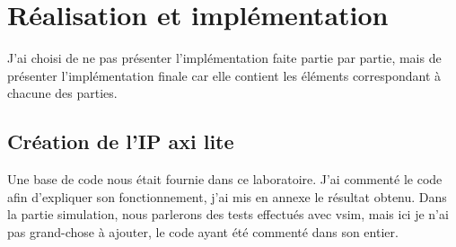 \section{Réalisation et implémentation}

J'ai choisi de ne pas présenter l'implémentation faite partie par partie, mais de présenter l'implémentation finale car elle contient les éléments correspondant à chacune des parties. 

\subsection{Création de l'IP axi lite}

Une base de code nous était fournie dans ce laboratoire. J'ai commenté le code afin d'expliquer son fonctionnement, j'ai mis en annexe le résultat obtenu. Dans la partie simulation, nous parlerons des tests effectués avec vsim, mais ici je n'ai pas grand-chose à ajouter, le code ayant été commenté dans son entier.

